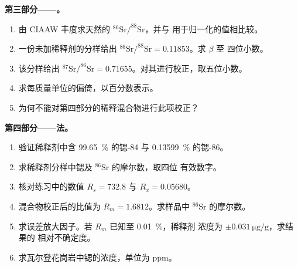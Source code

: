 \begin{problem}
\noindent\textbf{第三部分——。}
\begin{enumerate}[resume]
  \item 由 CIAAW 丰度求天然的 $^{86}\mathrm{Sr}/^{88}\mathrm{Sr}$，并与
        用于归一化的值相比较。
  \item 一份未加稀释剂的分样给出 $^{86}\mathrm{Sr}/^{88}\mathrm{Sr} = 0.11853$。求 $\beta$ 至
        四位小数。
  \item 该分样给出 $^{87}\mathrm{Sr}/^{86}\mathrm{Sr} = 0.71655$。对其进行校正，取五位小数。
  \item 求每质量单位的偏倚，以百分数表示。
  \item 为何不能对第四部分的稀释混合物进行此项校正？
\end{enumerate}

\noindent\textbf{第四部分——法。}
\begin{enumerate}[resume]
  \item 验证稀释剂中含 \qty{99.65}{\percent} 的锶-84 与 \qty{0.13599}{\percent}
        的锶-86。
  \item 求稀释剂分样中锶及 $^{86}\mathrm{Sr}$ 的摩尔数，取四位
        有效数字。
  \item 核对练习中的数值 $R_s = 732.8$ 与 $R_x = 0.05680$。
  \item 混合物校正后的比值为 $R_m = 1.6812$。求样品中 $^{86}\mathrm{Sr}$
        的摩尔数。
  \item 求误差放大因子。若 $R_m$ 已知至 \qty{0.01}{\percent}，稀释剂
        浓度为 $\pm\qty{0.031}{\micro\gram\per\gram}$，求结果的
        相对不确定度。
  \item 求瓦尔登花岗岩中锶的浓度，单位为 ppm。
\end{enumerate}
\end{problem}
